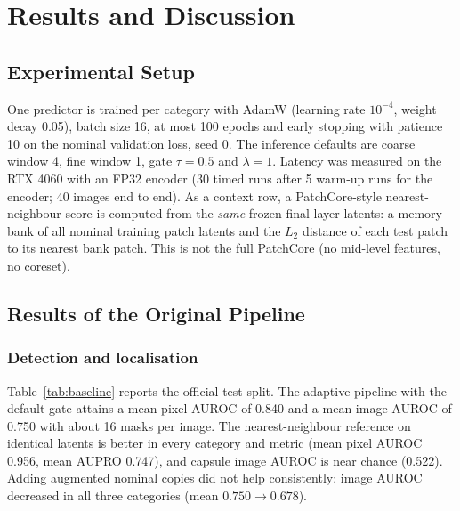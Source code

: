 \documentclass[12pt,a4paper,oneside]{report}
\begin{document}
\chapter{Results and Discussion}

\section{Experimental Setup}

One predictor is trained per category with AdamW (learning rate $10^{-4}$,
weight decay 0.05), batch size 16, at most 100 epochs and early stopping
with patience 10 on the nominal validation loss, seed 0. The inference
defaults are coarse window 4, fine window 1, gate $\tau=0.5$ and
$\lambda=1$. Latency was measured on the RTX 4060 with an FP32 encoder (30
timed runs after 5 warm-up runs for the encoder; 40 images end to end). As a
context row, a PatchCore-style nearest-neighbour score is computed from the
\emph{same} frozen final-layer latents: a memory bank of all nominal
training patch latents and the $L_2$ distance of each test patch to its
nearest bank patch. This is not the full PatchCore (no mid-level features,
no coreset).

\section{Results of the Original Pipeline}

\subsection{Detection and localisation}

Table~\ref{tab:baseline} reports the official test split. The adaptive
pipeline with the default gate attains a mean pixel AUROC of 0.840 and a mean
image AUROC of 0.750 with about 16 masks per image. The nearest-neighbour
reference on identical latents is better in every category and metric (mean
pixel AUROC 0.956, mean AUPRO 0.747), and capsule image AUROC is near chance
(0.522). Adding augmented nominal copies did not help consistently: image
AUROC decreased in all three categories (mean $0.750\rightarrow0.678$).

\begin{table}[H]
\centering
\caption{Test results on three MVTec AD categories for the original pipeline.
``Default gate'' uses $\tau=0.5$; ``calibrated gate'' uses the 0.99 token
quantile of nominal validation scores; the reference is a nearest-neighbour
score on the same latents.}
\label{tab:baseline}

\end{table}
\end{document}
